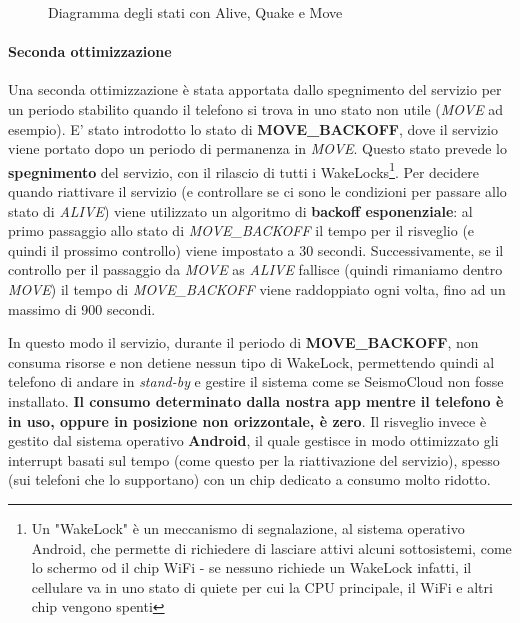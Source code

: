 \documentclass[a4paper,10pt]{memoir}
\begin{document}
\begin{figure}[ht]
\centering
\label{fig:scs_sm1}
\caption{Diagramma degli stati con Alive, Quake e Move}
\end{figure}

\paragraph{Seconda ottimizzazione} Una seconda ottimizzazione è stata apportata dallo spegnimento del servizio per un periodo stabilito quando il telefono si trova in uno stato non utile (\textit{MOVE} ad esempio). E' stato introdotto lo stato di \textbf{MOVE\_BACKOFF}, dove il servizio viene portato dopo un periodo di permanenza in \textit{MOVE}. Questo stato prevede lo \textbf{spegnimento} del servizio, con il rilascio di tutti i WakeLocks\footnote{Un "WakeLock" è un meccanismo di segnalazione, al sistema operativo Android, che permette di richiedere di lasciare attivi alcuni sottosistemi, come lo schermo od il chip WiFi - se nessuno richiede un WakeLock infatti, il cellulare va in uno stato di quiete per cui la CPU principale, il WiFi e altri chip vengono spenti}. Per decidere quando riattivare il servizio (e controllare se ci sono le condizioni per passare allo stato di \textit{ALIVE}) viene utilizzato un algoritmo di \textbf{backoff esponenziale}: al primo passaggio allo stato di \textit{MOVE\_BACKOFF} il tempo per il risveglio (e quindi il prossimo controllo) viene impostato a 30 secondi. Successivamente, se il controllo per il passaggio da \textit{MOVE} as \textit{ALIVE} fallisce (quindi rimaniamo dentro \textit{MOVE}) il tempo di \textit{MOVE\_BACKOFF} viene raddoppiato ogni volta, fino ad un massimo di 900 secondi.

In questo modo il servizio, durante il periodo di \textbf{MOVE\_BACKOFF}, non consuma risorse e non detiene nessun tipo di WakeLock, permettendo quindi al telefono di andare in \textit{stand-by} e gestire il sistema come se SeismoCloud non fosse installato. \textbf{Il consumo determinato dalla nostra app mentre il telefono è in uso, oppure in posizione non orizzontale, è zero}. Il risveglio invece è gestito dal sistema operativo \textbf{Android}, il quale gestisce in modo ottimizzato gli interrupt basati sul tempo (come questo per la riattivazione del servizio), spesso (sui telefoni che lo supportano) con un chip dedicato a consumo molto ridotto.
\end{document}
